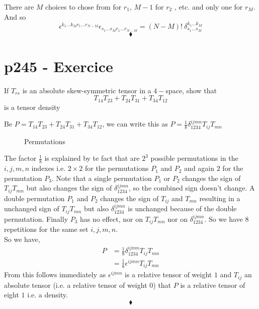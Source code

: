 There are $M$ choices to chose from for $r_1$, $M-1$ for $r_2$ , etc. and only one for $r_M$. And so $$\epsilon^{k_1\dots k_M r_1\dots r_{N-M}}\epsilon_{s_1\dots s_M r_1\dots r_{N-M}}= \left(N-M\right)!\ \delta^{k_1\dots k_M}_{s_1\dots s_M}$$
$$\blacklozenge$$
\newpage




\section{p245 - Exercice }
\begin{tcolorbox}
If $T_{rs}$  is an absolute skew-symmetric tensor in a $4-$space, show that $$T_{14}T_{23}+T_{24}T_{31}+T_{34}T_{12}$$ is a tensor density
\end{tcolorbox}
Be $P= T_{14}T_{23}+T_{24}T_{31}+T_{34}T_{12}$, we can write this as $P= \frac{1}{8}\delta^{ijmn}_{1234}T_{ij}T_{mn}$ 
\begin{figure}[H]%
    \centering
    \subfloat[]{}
\caption{Permutations}
\label{fig:fig_p247}
\end{figure}
The factor $\frac{1}{8}$ is explained by te fact that are $2^3$ possible permutations in the $i,j,m,n$ indexes i.e. $2\times2$ for the permutations $P_1$ and $P_2$ and again $2$ for the permutation $P_3$. Note that a single permutation $P_1$ or $P_2$ changes the sign of  $T_{ij}T_{mn}$ but also changes the sign of $\delta^{ijmn}_{1234}$, so the combined sign doesn't change. A double permutation $P_1$ and  $P_2$ changes the sign of  $T_{ij}$ and $T_{mn}$ resulting in a unchanged sign of  $T_{ij}T_{mn}$ but also $\delta^{ijmn}_{1234}$ is unchanged because of the double permutation. Finally $P_3$ has no effect, nor on $T_{ij}T_{mn}$ nor on $\delta^{ijmn}_{1234}$. So we have 8 repetitions for  the same set $i,j,m,n$.\\
So we have, 
\begin{align}
P&= \frac{1}{8}\delta^{ijmn}_{1234}T_{ij}T_{mn}\\
&= \frac{1}{8}\epsilon^{ijmn}T_{ij}T_{mn}
\end{align}
From this follows immediately as $\epsilon^{ijmn}$ is a relative tensor of weight $1$ and $T_{ij}$ an absolute tensor (i.e. a relative tensor of weight $0$) that $P$ is a relative tensor of eight $1$ i.e. a density.
$$\blacklozenge$$
\newpage



